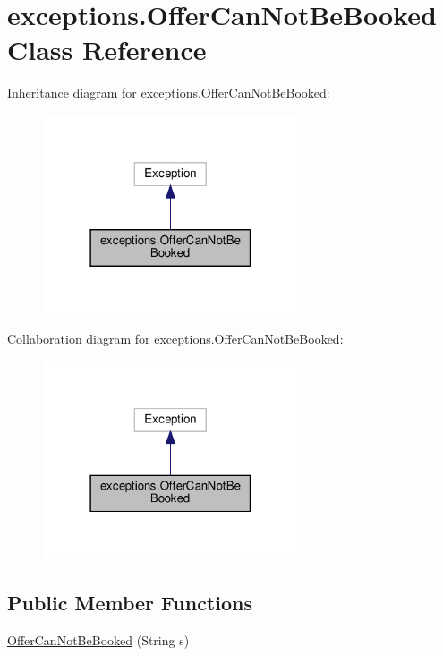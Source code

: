 \hypertarget{classexceptions_1_1_offer_can_not_be_booked}{}\section{exceptions.\+Offer\+Can\+Not\+Be\+Booked Class Reference}
\label{classexceptions_1_1_offer_can_not_be_booked}


Inheritance diagram for exceptions.\+Offer\+Can\+Not\+Be\+Booked\+:
\nopagebreak
\begin{figure}[H]
\begin{center}
\leavevmode
\includegraphics[width=214pt]{classexceptions_1_1_offer_can_not_be_booked__inherit__graph}
\end{center}
\end{figure}


Collaboration diagram for exceptions.\+Offer\+Can\+Not\+Be\+Booked\+:
\nopagebreak
\begin{figure}[H]
\begin{center}
\leavevmode
\includegraphics[width=214pt]{classexceptions_1_1_offer_can_not_be_booked__coll__graph}
\end{center}
\end{figure}
\subsection*{Public Member Functions}
\begin{DoxyCompactItemize}
\item 
\mbox{\hyperlink{classexceptions_1_1_offer_can_not_be_booked_a08f25182868a230f2b49b37483560486}{Offer\+Can\+Not\+Be\+Booked}} (String s)
\end{DoxyCompactItemize}


